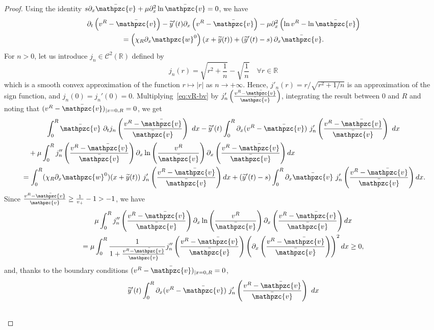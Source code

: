 \documentclass[AHL,Unicode,longabstracts,published]{cedram}
\newcommand{\R}{\mathbb{R}}
\newcommand{\bv}{\bar{\mathpzc{v}}}
\newcommand{\cC}{\mathcal C}
\newcommand{\tw}{\mathpzc{w}}
\newcommand{\ty}{\widetilde{y}}
\let\oldforall\forall
\renewcommand*{\forall}{\mathrel{\oldforall}}
\begin{document}
\begin{proof}
Using the identity $s\partial_x \bv + \mu \partial^2_x \ln \bv = 0$, we have
\begin{multline}\label{eq:vR-bv}
\partial_t\left(v^R - \bv\right) - \ty'(t) \partial_x\left(v^R - \bv\right) - \mu \partial^2_x \left(\ln v^R - \ln \bv\right) \\
= \left(\chi_R\partial_x \tw^0\right)(x+\ty(t)) + \left(\ty'(t) -s\right) \partial_x \bv.
\end{multline}
For $n > 0$, let us introduce $j_n \in \cC^2(\R)$ defined by
\[	
j_n(r) = \sqrt{r^2 + \frac{1}{n}} - \sqrt{\frac{1}{n}} \quad \forall r \in \R
\]
which is a smooth convex approximation of the function $r \mapsto |r|$ as $n \to + \infty$. Hence, $j'_n(r) = r/\sqrt{r^2+ 1/n}$ is an approximation of the sign function, and $j_n(0)=j_n'(0)=0$. Multiplying~\eqref{eq:vR-bv} by $j'_n\left(\frac{v^R -\bv}{\bv}\right)$, integrating the result between $0$ and $R$ and noting that $(v^R-\bv)_{|x=0,R}=0$, we get
\begin{multline*}
\int_0^R \bv \ \partial_t j_n\left(\frac{v^R -\bv}{\bv}\right) \ dx - \ty'(t) \int_0^R \partial_x(v^R -\bv)\ j_n'\left(\frac{v^R -\bv}{\bv}\right) \ dx \\
\begin{aligned}
& \quad + \mu \int_0^R j_n''\left(\frac{v^R-\bv}{\bv}\right)\partial_x \ln\left(\frac{v^R}{\bv}\right) \partial_x\left(\frac{v^R -\bv}{\bv}\right)dx \\
& = \int_0^R (\chi_R\partial_x \tw^0)(x+\ty(t)) \ j'_n\left(\frac{v^R -\bv}{\bv}\right) dx + (\ty'(t) -s) \int_0^R \partial_x \bv \ j'_n\left(\frac{v^R -\bv}{\bv}\right) dx.
\end{aligned}
\end{multline*}
Since $\frac{v^R-\bv}{\bv} \geq \frac{1}{v_+} - 1 > -1$, we have
\begin{multline*}
\mu \int_0^R j_n''\left(\frac{v^R-\bv}{\bv}\right)\partial_x \ln\left(\frac{v^R}{\bv}\right) \partial_x\left(\frac{v^R -\bv}{\bv}\right)dx \\
 = \mu \int_0^R \dfrac{1}{1+\frac{v^R-\bv}{\bv}} j_n''\left(\frac{v^R-\bv}{\bv}\right)\left(\partial_x \left(\frac{v^R-\bv}{\bv}\right)\right)^2 dx
\geq 0,
\end{multline*}
and, thanks to the boundary conditions $(v^R-\bv)_{|x=0,R}=0$,
\begin{multline*}
 \ty'(t) \int_0^R \partial_x(v^R -\bv)\ j_n'\left(\frac{v^R -\bv}{\bv}\right) \ dx \\
\begin{aligned}

\end{aligned}
\end{multline*}
\end{proof}
\end{document}

